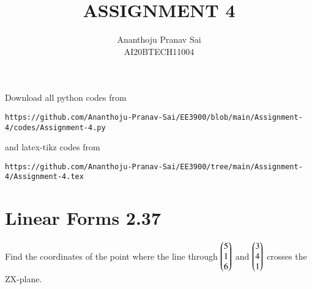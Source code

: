 \documentclass[journal,12pt,twocolumn]{IEEEtran}
\begin{document}
     \def\centbox#1{\makebox[0in]{#1}}
     \def\topbox#1{\raisebox{-\baselineskip}[0in][0in]{#1}}
     \def\midbox#1{\raisebox{-0.5\baselineskip}[0in][0in]{#1}}
\vspace{3cm}
\title{ASSIGNMENT 4}
\author{Ananthoju Pranav Sai \\ AI20BTECH11004}
\maketitle
\newpage
\bigskip
\renewcommand{\thefigure}{\theenumi}
\renewcommand{\thetable}{\theenumi}
Download all python codes from 
\begin{lstlisting}
https://github.com/Ananthoju-Pranav-Sai/EE3900/blob/main/Assignment-4/codes/Assignment-4.py
\end{lstlisting}
%
and latex-tikz codes from 
%
\begin{lstlisting}
https://github.com/Ananthoju-Pranav-Sai/EE3900/tree/main/Assignment-4/Assignment-4.tex
\end{lstlisting}
%
\section{Linear Forms 2.37}
Find the coordinates of the point where the line through $\begin{pmatrix}5\\1\\6\end{pmatrix}$ and $\begin{pmatrix}3\\4\\1\end{pmatrix}$ crosses the ZX-plane.
%
\end{document}
